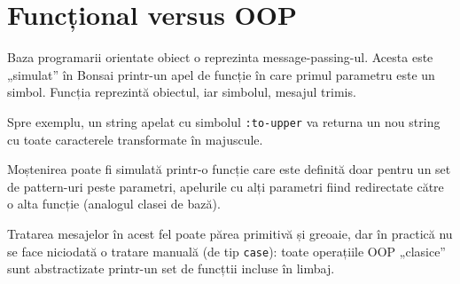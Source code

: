 \documentclass[12pt,a4paper]{memoir}
\begin{document}
\section{Funcțional versus OOP}

Baza programarii orientate obiect o reprezinta message-passing-ul. Acesta este „simulat” în Bonsai printr-un apel de funcție în care primul parametru este un simbol. Funcția reprezintă obiectul, iar simbolul, mesajul trimis. 

Spre exemplu, un string apelat cu simbolul \texttt{:to-upper} va returna un nou string cu toate caracterele transformate în majuscule. 

Moștenirea poate fi simulată printr-o funcție care este definită doar pentru un set de pattern-uri peste parametri, apelurile cu alți parametri fiind redirectate către o alta funcție (analogul clasei de bază).

Tratarea mesajelor în acest fel poate părea primitivă și greoaie, dar în practică nu se face niciodată o tratare manuală (de tip \texttt{case}): toate operațiile OOP „clasice” sunt abstractizate printr-un set de funcțtii incluse în limbaj.

{}

\end{document}
